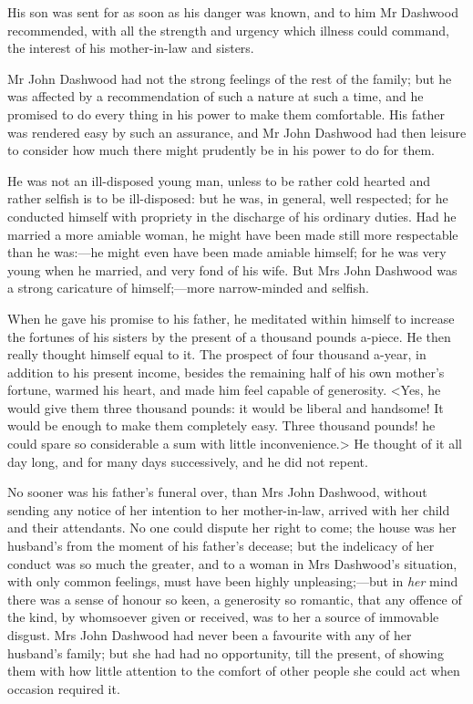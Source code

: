 His son was sent for as soon as his danger was known, and to him Mr Dashwood recommended, with all the strength and urgency which illness could command, the interest of his mother-in-law and sisters.

Mr John Dashwood had not the strong feelings of the rest of the family; but he was affected by a recommendation of such a nature at such a time, and he promised to do every thing in his power to make them comfortable. His father was rendered easy by such an assurance, and Mr John Dashwood had then leisure to consider how much there might prudently be in his power to do for them.

He was not an ill-disposed young man, unless to be rather cold hearted and rather selfish is to be ill-disposed: but he was, in general, well respected; for he conducted himself with propriety in the discharge of his ordinary duties. Had he married a more amiable woman, he might have been made still more respectable than he was:—he might even have been made amiable himself; for he was very young when he married, and very fond of his wife. But Mrs John Dashwood was a strong caricature of himself;—more narrow-minded and selfish.

When he gave his promise to his father, he meditated within himself to increase the fortunes of his sisters by the present of a thousand pounds a-piece. He then really thought himself equal to it. The prospect of four thousand a-year, in addition to his present income, besides the remaining half of his own mother's fortune, warmed his heart, and made him feel capable of generosity. <Yes, he would give them three thousand pounds: it would be liberal and handsome! It would be enough to make them completely easy. Three thousand pounds! he could spare so considerable a sum with little inconvenience.> He thought of it all day long, and for many days successively, and he did not repent.

No sooner was his father's funeral over, than Mrs John Dashwood, without sending any notice of her intention to her mother-in-law, arrived with her child and their attendants. No one could dispute her right to come; the house was her husband's from the moment of his father's decease; but the indelicacy of her conduct was so much the greater, and to a woman in Mrs Dashwood's situation, with only common feelings, must have been highly unpleasing;—but in \textit{her} mind there was a sense of honour so keen, a generosity so romantic, that any offence of the kind, by whomsoever given or received, was to her a source of immovable disgust. Mrs John Dashwood had never been a favourite with any of her husband's family; but she had had no opportunity, till the present, of showing them with how little attention to the comfort of other people she could act when occasion required it.

